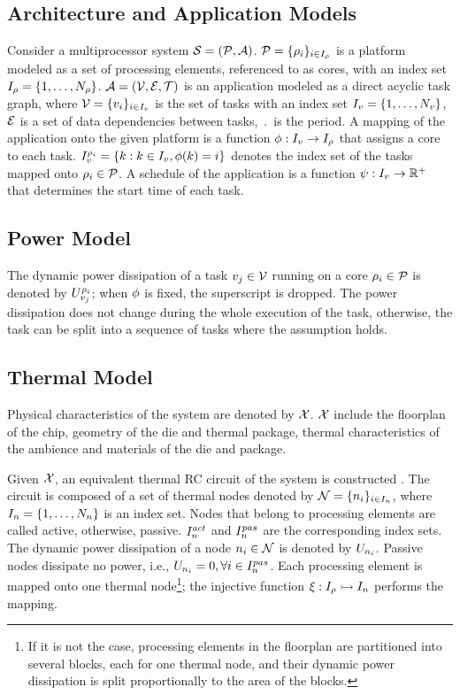 \subsection{Architecture and Application Models}
Consider a multiprocessor system $\mathcal{S} = (\mathcal{P}, \mathcal{A})$. $\mathcal{P} = \{ \rho_i \}_{i \in I_\rho}$ is a platform modeled as a set of processing elements, referenced to as cores, with an index set $I_\rho = \{ 1, \dots, N_\rho \}$. $\mathcal{A} = (\mathcal{V}, \mathcal{E}, \mathcal{T})$ is an application modeled as a direct acyclic task graph, where $\mathcal{V} = \{v_i\}_{i \in I_v}$ is the set of tasks with an index set $I_v = \{ 1, \dots, N_v \}$, $\mathcal{E}$ is a set of data dependencies between tasks, $\period$ is the period. A mapping of the application onto the given platform is a function $\phi: I_v \to I_\rho$ that assigns a core to each task. $I_v^{\rho_i} = \{ k: k \in I_v, \phi(k) = i \}$ denotes the index set of the tasks mapped onto $\rho_i \in \mathcal{P}$. A schedule of the application is a function $\psi: I_v \to \mathbb{R}^{+}$ that determines the start time of each task.

\subsection{Power Model}
The dynamic power dissipation of a task $v_j \in \mathcal{V}$ running on a core $\rho_i \in \mathcal{P}$ is denoted by $U^{\rho_i}_{v_j}$; when $\phi$ is fixed, the superscript is dropped. The power dissipation does not change during the whole execution of the task, otherwise, the task can be split into a sequence of tasks where the assumption holds.

\subsection{Thermal Model}
Physical characteristics of the system are denoted by $\mathcal{X}$. $\mathcal{X}$ include the floorplan of the chip, geometry of the die and thermal package, thermal characteristics of the ambience and materials of the die and package.

Given $\mathcal{X}$, an equivalent thermal RC circuit of the system is constructed \cite{kreith2000}. The circuit is composed of a set of thermal nodes denoted by $\mathcal{N} = \{ n_i \}_{i \in I_n}$, where $I_n = \{ 1, \dots, N_n \}$ is an index set. Nodes that belong to processing elements are called active, otherwise, passive. $I^{act}_n$ and $I^{pas}_n$ are the corresponding index sets. The dynamic power dissipation of a node $n_i \in \mathcal{N}$ is denoted by $U_{n_i}$. Passive nodes dissipate no power, i.e., $U_{n_i} = 0, \forall i \in I^{pas}_n$. Each processing element is mapped onto one thermal node\footnote{If it is not the case, processing elements in the floorplan are partitioned into several blocks, each for one thermal node, and their dynamic power dissipation is split proportionally to the area of the blocks.}; the injective function $\xi: I_\rho \rightarrowtail I_n$ performs the mapping.

